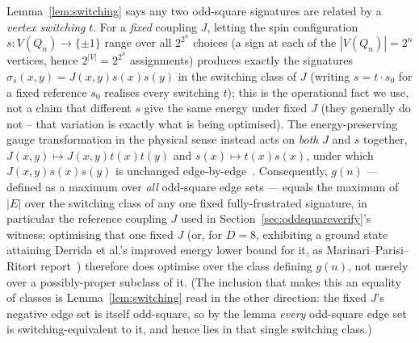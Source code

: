 \documentclass[12pt]{article}
\begin{document}
Lemma~\ref{lem:switching} says any two odd-square signatures are related by
a \emph{vertex switching} $t$. For a \emph{fixed} coupling $J$, letting the
spin configuration $s:V(Q_n)\to\{\pm1\}$ range over all $2^{2^n}$ choices
(a sign at each of the $|V(Q_n)|=2^n$ vertices, hence $2^{|V|}=2^{2^n}$ assignments) produces
exactly the
signatures $\sigma_s(x,y)=J(x,y)s(x)s(y)$ in the switching class of $J$
(writing $s=t\cdot s_0$ for a fixed reference $s_0$ realises every
switching $t$); this is the operational fact we use, not a claim that
different $s$ give the same energy under fixed $J$ (they generally do
not -- that variation is exactly what is being optimised). The
energy-preserving gauge transformation in the physical sense instead
acts on \emph{both} $J$ and $s$ together, $J(x,y)\mapsto J(x,y)t(x)t(y)$
and $s(x)\mapsto t(x)s(x)$, under which $J(x,y)s(x)s(y)$ is unchanged
edge-by-edge~\cite{MPR95}.
Consequently, $g(n)$ — defined as a maximum over \emph{all} odd-square
edge sets — equals the maximum of $|E|$ over the switching class of any
one fixed fully-frustrated signature, in particular the reference coupling
$J$ used in Section~\ref{sec:oddsquareverify}'s witness; optimising that
one fixed $J$ (or, for $D=8$, exhibiting a ground state attaining
Derrida et al.'s improved energy lower bound for it, as
Marinari--Parisi--Ritort report~\cite{MPR95}) therefore does optimise
over the class defining $g(n)$, not merely over a possibly-proper
subclass of it. (The inclusion that makes this an equality of classes is
Lemma~\ref{lem:switching} read in the other direction: the fixed $J$'s
negative edge set is itself odd-square, so by the lemma \emph{every}
odd-square edge set is switching-equivalent to it, and hence lies in
that single switching class.)
\end{document}
